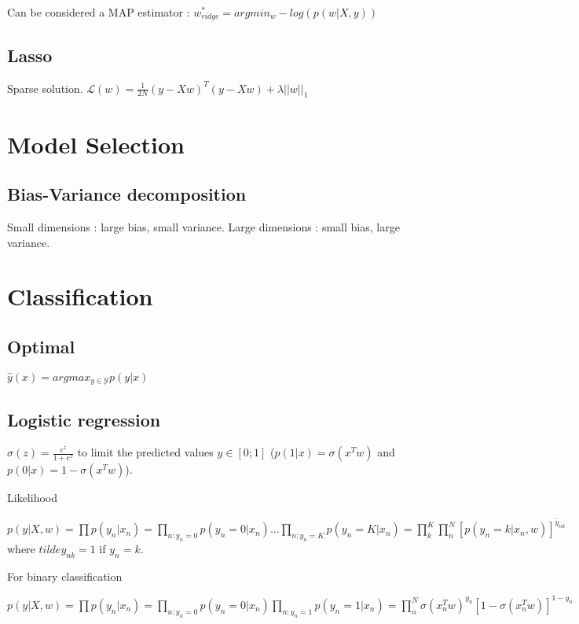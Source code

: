 Can be considered a MAP estimator : $w^*_{ridge} = arg min_w - log(p(w|X,y))$

\subsection{Lasso}
Sparse solution.
$\mathcal{L}(w) = \frac{1}{2N} (y - Xw)^T(y - Xw) + \lambda ||w||_1 $

\section{Model Selection}
\subsection{Bias-Variance decomposition}
Small dimensions : large bias, small variance.
Large dimensions : small bias, large variance.


\section{Classification}
\subsection{Optimal}
$\hat{y}(x) = argmax_{y\in \mathcal{Y}} p(y|x)$

\subsection{Logistic regression}
$\sigma(z) = \frac{e^z}{1+e^z}$ to limit the predicted values $y\in [0;1]$ ($p(1|x) = \sigma(x^Tw)$ and $p(0|x) = 1-\sigma(x^Tw)$).

Likelihood

$p(y | X,w) = \prod p(y_n|x_n) = \prod_{n:y_n=0} p(y_n=0|x_n) ... \prod_{n:y_n=K} p(y_n=K|x_n) = \prod^K_k \prod^N_n [p(y_n = k | x_n,w)]^{\tilde{y}_{nk}}$ where ${tilde{y}_{nk}} = 1$ if $y_n=k$.

For binary classification

$p(y | X, w) = \prod p(y_n|x_n) = \prod_{n:y_n=0} p(y_n=0|x_n) \prod_{n:y_n=1} p(y_n=1|x_n) = \prod^N_n \sigma({x_n^T w})^{y_n}[1-\sigma({x_n^T w})]^{1-y_n}$

